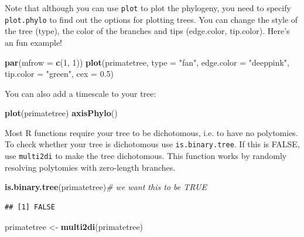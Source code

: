 \documentclass[12pt]{article}
\newcommand{\KeywordTok}[1]{\textcolor[rgb]{0.13,0.29,0.53}{\textbf{{#1}}}}
\newcommand{\DataTypeTok}[1]{\textcolor[rgb]{0.13,0.29,0.53}{{#1}}}
\newcommand{\DecValTok}[1]{\textcolor[rgb]{0.00,0.00,0.81}{{#1}}}
\newcommand{\FloatTok}[1]{\textcolor[rgb]{0.00,0.00,0.81}{{#1}}}
\newcommand{\StringTok}[1]{\textcolor[rgb]{0.31,0.60,0.02}{{#1}}}
\newcommand{\CommentTok}[1]{\textcolor[rgb]{0.56,0.35,0.01}{\textit{{#1}}}}
\newcommand{\NormalTok}[1]{{#1}}
\begin{document}
Note that although you can use \texttt{plot} to plot the phylogeny, you need to specify \texttt{plot.phylo} to find out the options for plotting trees. You can change the style of the tree (type), the color of the branches and tips (edge.color, tip.color). Here’s an fun example! 

\begin{snugshade}
\begin{Highlighting}[]
\KeywordTok{par}\NormalTok{(}\DataTypeTok{mfrow =} \KeywordTok{c}\NormalTok{(}\DecValTok{1}\NormalTok{, }\DecValTok{1}\NormalTok{))}
\KeywordTok{plot}\NormalTok{(primatetree, }\DataTypeTok{type =} \StringTok{"fan"}\NormalTok{, }\DataTypeTok{edge.color =} \StringTok{"deeppink"}\NormalTok{, }\DataTypeTok{tip.color =} 
      \StringTok{"green"}\NormalTok{, }\DataTypeTok{cex =} \FloatTok{0.5}\NormalTok{)}
\end{Highlighting}
\end{snugshade}

You can also add a timescale to your tree:

\begin{snugshade}
\begin{Highlighting}[]
\KeywordTok{plot}\NormalTok{(primatetree)}
\KeywordTok{axisPhylo}\NormalTok{()}
\end{Highlighting}
\end{snugshade}

Most R functions require your tree to be dichotomous, i.e. to have no polytomies. To check whether your tree is dichotomous use \texttt{is.binary.tree}. If this is FALSE, use \texttt{multi2di} to make the tree dichotomous. This function works by randomly resolving polytomies with zero-length branches.

\begin{snugshade}
\begin{Highlighting}[]
\KeywordTok{is.binary.tree}\NormalTok{(primatetree)}\CommentTok{# we want this to be TRUE}
\end{Highlighting}
\end{snugshade}

\begin{verbatim}
## [1] FALSE
\end{verbatim}

\begin{snugshade}
\begin{Highlighting}[]
\NormalTok{primatetree <-}\StringTok{ }\KeywordTok{multi2di}\NormalTok{(primatetree)}
\end{Highlighting}
\end{snugshade}
\end{document}
